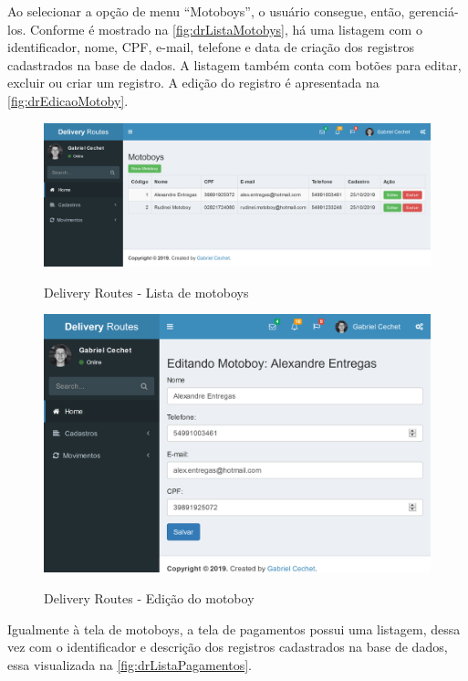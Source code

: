 \newpage
Ao selecionar a opção de menu “Motoboys”, o usuário consegue, então, gerenciá-los. Conforme é mostrado na \autoref{fig:drListaMotobys}, há uma listagem com o identificador, nome, CPF, e-mail, telefone e data de criação dos registros cadastrados na base de dados. A listagem também conta com botões para editar, excluir ou criar um registro. A edição do registro é apresentada na \autoref{fig:drEdicaoMotoby}.

\begin{figure}[H]
    \centering
    \caption{Delivery Routes - Lista de motoboys}
    \includegraphics[width=1.0\textwidth]{./dados/figuras/fig18}
    \label{fig:drListaMotobys}
\end{figure}

\begin{figure}[H]
    \centering
    \caption{Delivery Routes - Edição do motoboy}
    \includegraphics[width=1.0\textwidth]{./dados/figuras/fig19}
    \label{fig:drEdicaoMotoby}
\end{figure}

\newpage
Igualmente à tela de motoboys, a tela de pagamentos possui uma listagem, dessa vez com o identificador e descrição dos registros cadastrados na base de dados, essa visualizada na \autoref{fig:drListaPagamentos}. 

